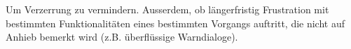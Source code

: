 Um Verzerrung zu vermindern. Ausserdem, ob längerfristig Frustration mit bestimmten 
Funktionalitäten eines bestimmten Vorgangs auftritt, die nicht auf Anhieb bemerkt wird (z.B. 
überflüssige Warndialoge). 
